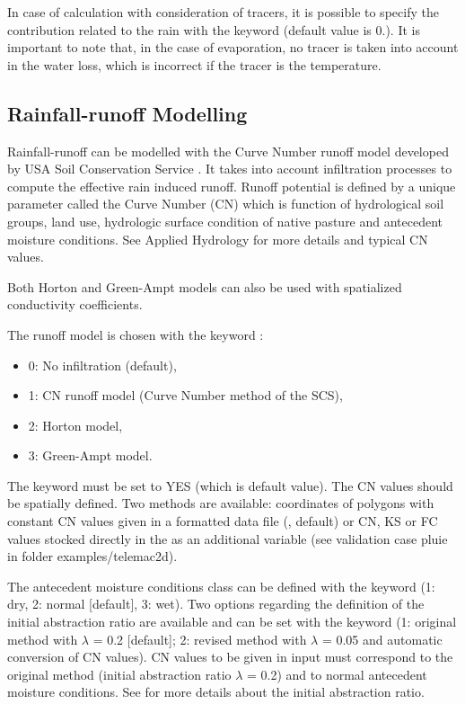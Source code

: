 In case of calculation with consideration of tracers, it is possible to specify
the contribution related to the rain with the keyword
 (default value is 0.).
It is important to note that, in the case of evaporation, no tracer is taken
into account in the water loss, which is incorrect if the tracer is the
temperature.

\subsection{Rainfall-runoff Modelling}

Rainfall-runoff can be modelled with the Curve Number runoff model developed
by USA Soil Conservation Service \cite{soil1972national}. It takes into
account infiltration processes to compute the effective rain induced runoff.
Runoff potential is defined by a unique parameter called the Curve Number (CN)
which is function of hydrological soil groups, land use, hydrologic surface
condition of native pasture and antecedent moisture conditions.
See Applied Hydrology \citep{chow1988mays}
for more details and typical CN values.

Both Horton \cite{Horton1933} and Green-Ampt \cite{GreenAmpt1911} models can
also be used with spatialized conductivity coefficients.

The runoff model is chosen with the keyword
:
\begin{itemize}
\item 0: No infiltration (default),
\item 1: CN runoff model (Curve Number method of the SCS),
\item 2: Horton model,
\item 3: Green-Ampt model.
\end{itemize}
The keyword  must be set to YES (which is default value).
The CN values should be spatially defined.
Two methods are available: coordinates of polygons with constant CN values
given in a formatted data file (, default)
or CN, KS or FC values stocked directly in the  as
an additional variable (see validation case pluie in folder examples/telemac2d).

The antecedent moisture conditions class can be defined with the keyword
 (1: dry, 2: normal [default], 3: wet).
Two options regarding the definition of the initial abstraction ratio are
available
and can be set with the keyword 
(1: original method with $\lambda$ = 0.2 [default];
 2: revised method with $\lambda$ = 0.05 and automatic conversion of CN values).
CN values to be given in input must correspond to the original method
(initial abstraction ratio $\lambda$ = 0.2) and to normal antecedent moisture
conditions. See \cite{woodward2003runoff} for more details about the initial
abstraction ratio.

